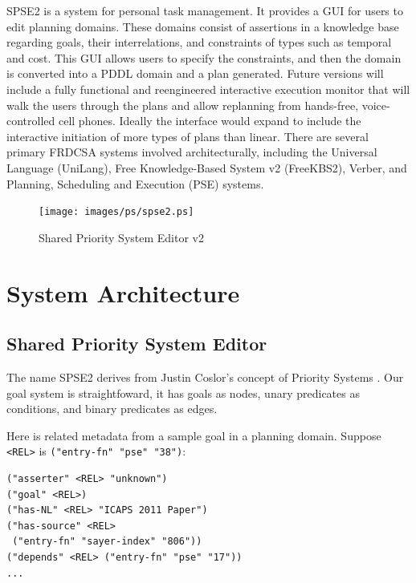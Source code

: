 \documentclass[letterpaper]{article}
\begin{document}
\noindent SPSE2 is a system for personal task management.  It provides
a GUI for users to edit planning domains.  These domains consist of
assertions in a knowledge base regarding goals, their interrelations,
and constraints of types such as temporal and cost.  This GUI allows
users to specify the constraints, and then the domain is converted
into a PDDL domain and a plan generated.  Future versions will include
a fully functional and reengineered interactive execution monitor that
will walk the users through the plans and allow replanning from
hands-free, voice-controlled cell phones.  Ideally the interface would
expand to include the interactive initiation of more types of plans
than linear.  There are several primary FRDCSA systems involved
architecturally, including the Universal Language (UniLang), Free
Knowledge-Based System v2 (FreeKBS2), Verber, and Planning, Scheduling and
Execution (PSE) systems.

\begin{figure}[h!]
  \centering
      \texttt{[image: images/ps/spse2.ps]}
  \caption{Shared Priority System Editor v2}
\end{figure}

\section{System Architecture}

\subsection{Shared Priority System Editor}

The name SPSE2 derives from Justin Coslor's concept of Priority Systems
\cite{coslor2008}.  Our goal system is straightfoward, it has goals as
nodes, unary predicates as conditions, and binary predicates as edges.

\noindent Here is related metadata from a sample goal in a planning
domain.  Suppose {\tt <REL>} is {\tt ("entry-fn" "pse" "38")}:

\begin{footnotesize}
\begin{verbatim}
("asserter" <REL> "unknown")
("goal" <REL>)
("has-NL" <REL> "ICAPS 2011 Paper")
("has-source" <REL>
 ("entry-fn" "sayer-index" "806"))
("depends" <REL> ("entry-fn" "pse" "17"))
...
\end{verbatim}
\end{footnotesize}
\end{document}
